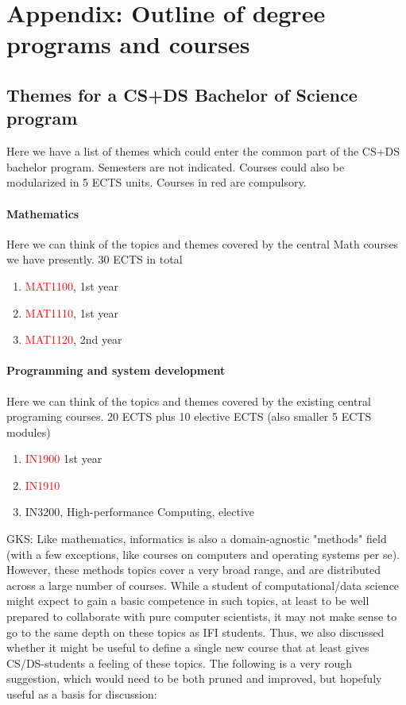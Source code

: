 \documentclass[oneside,final,10pt]{article}
\begin{document}
\section*{Appendix:  Outline of degree programs and courses}

\subsection*{Themes for a CS+DS Bachelor of Science program}

Here we have a list of themes which could enter the common part of the CS+DS bachelor program.  
Semesters are not indicated. Courses could also be modularized in 5 ECTS units. Courses in red are compulsory.



\paragraph{Mathematics}
Here we can think of the topics and themes covered by the central  Math courses we have presently.
30 ECTS in total
\begin{enumerate}
\color{red}
    \item \textcolor{red}{MAT1100}, 1st year
    \item \textcolor{red}{MAT1110}, 1st year
    \item \textcolor{red}{MAT1120}, 2nd year
\end{enumerate}

\paragraph{Programming and system development}
Here we can think of the topics and themes covered by the existing central programing courses.
20 ECTS plus 10 elective ECTS (also smaller 5 ECTS modules)
\begin{enumerate}
    \item \textcolor{red}{IN1900} 1st year
    \item \textcolor{red}{IN1910}
    \item IN3200, High-performance Computing, elective
\end{enumerate}

GKS: Like mathematics, informatics is also a domain-agnostic "methods" field (with a few exceptions, like courses on computers and operating systems per se). However, these methods topics cover a very broad range, and are distributed across a large number of courses. While a student of computational/data science might expect to gain a basic competence in such topics, at least to be well prepared to collaborate with pure computer scientists, it may not make sense to go to the same depth on these topics as IFI students. Thus, we also discussed whether it might be useful to define a single new course that at least gives CS/DS-students a feeling of these topics. The following is a very rough suggestion, which would need to be both pruned and improved, but hopefuly useful as a basis for discussion:
\end{document}
